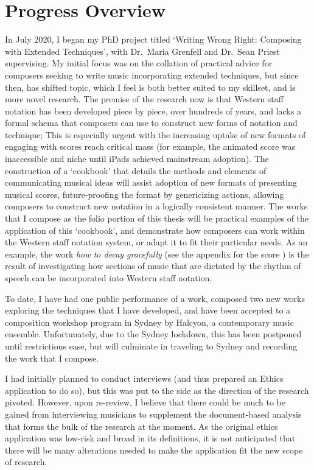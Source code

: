 \section{Progress Overview}
In July 2020, I began my PhD project titled `Writing Wrong Right: Composing with Extended Techniques', with Dr.\ Maria Grenfell and Dr.\ Sean Priest supervising.
My initial focus was on the collation of practical advice for composers seeking to write music incorporating extended techniques, but since then, has shifted topic, which I feel is both better suited to my skillset, and is more novel research.
The premise of the research now is that Western staff notation has been developed piece by piece, over hundreds of years, and lacks a formal schema that composers can use to construct new forms of notation and technique; 
This is especially urgent with the increasing uptake of new formats of engaging with scores reach critical mass (for example, the animated score was inaccessible and niche until iPads achieved mainstream adoption).
The construction of a `cookbook' that details the methods and elements of communicating musical ideas will assist adoption of new formats of presenting musical scores, future-proofing the format by genericizing actions, allowing composers to construct new notation in a logically consistent manner.
The works that I compose as the folio portion of this thesis will be practical examples of the application of this `cookbook', and demonstrate how composers can work within the Western staff notation system, or adapt it to fit their particular needs.
As an example, the work \emph{how to decay gracefully} (see 
the appendix for the score
) is the result of investigating how sections of music that are dictated by the rhythm of speech can be incorporated into Western staff notation.

To date, I have had one public performance of a work, composed two new works exploring the techniques that I have developed, and have been accepted to a composition workshop program in Sydney by Halcyon, a contemporary music ensemble.
Unfortunately, due to the Sydney lockdown, this has been postponed until restrictions ease, but will culminate in traveling to Sydney and recording the work that I compose.

I had initially planned to conduct interviews (and thus prepared an Ethics application to do so), but this was put to the side as the direction of the research pivoted.
However, upon re-review, I believe that there could be much to be gained from interviewing musicians to supplement the document-based analysis that forms the bulk of the research at the moment. 
As the original ethics application was low-risk and broad in its definitions, it is not anticipated that there will be many alterations needed to make the application fit the new scope of research.

